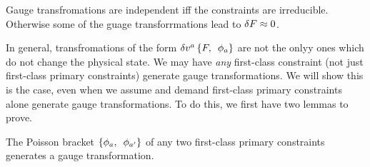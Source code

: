 \begin{prop}
Gauge transfromations are independent iff the constraints are
irreducible. Otherwise some of the guage transforrmations lead to
$\delta F\approx 0$.
\end{prop}

In general, transfromations of the form
$\delta v^{a}\left\{F,\enspace\phi_{a}\right\}$ are not the onlyy ones which
do not change the physical state. We may have \emph{any} first-class
constraint (not just first-class primary constraints) generate gauge
transformations. We will show this is the case, even when we assume and
demand first-class primary constraints alone generate gauge
transformations. To do this, we first have two lemmas to prove.

\begin{lemma}
The Poisson bracket $\left\{\phi_{a},\enspace\phi_{a'}\right\}$ of any two
first-class primary constraints generates a gauge transformation.
\end{lemma}

